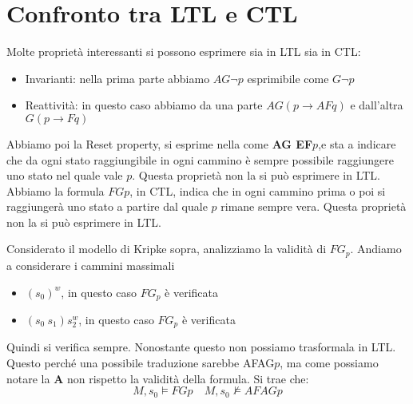 \section{Confronto tra LTL e CTL}
Molte proprietà interessanti si possono esprimere sia in LTL  sia in CTL:
    \begin{itemize}
    \item Invarianti: nella prima parte abbiamo $AG \neg p$ esprimibile come $G \neg p$
    \item Reattività: in questo caso abbiamo  da una parte $AG(p \to AFq)$ e dall'altra $G(p \to Fq)$

\end{itemize}
Abbiamo poi la Reset property, si esprime nella come \textbf{AG EF}$p$,e sta a indicare che da ogni stato raggiungibile in ogni cammino è sempre possibile raggiungere uno stato nel quale vale $p$. Questa proprietà non la si può esprimere in LTL.\\

Abbiamo la formula $FGp$, in CTL, indica che in ogni cammino prima o poi si raggiungerà uno stato a partire dal quale $p$ rimane sempre vera. Questa proprietà non la si può esprimere in LTL.

{\centering
{}
\par}

Considerato il modello di Kripke sopra, analizziamo la validità di $FG_p$. Andiamo a considerare i cammini massimali
\begin{itemize}
    \item $(s_0)^w$, in questo caso $FG_p$ è verificata
     \item $(s_0 \ s_1) s_2^w$, in questo caso $FG_p$ è verificata
\end{itemize}
Quindi si verifica sempre. Nonostante questo non possiamo trasformala in LTL. Questo perché una possibile traduzione sarebbe AFAG$p$, ma come possiamo notare la \textbf{A} non rispetto la validità della formula. Si trae che:
\[M,s_0 \vDash FGp \quad M,s_0 \nvDash AFAGp\]

